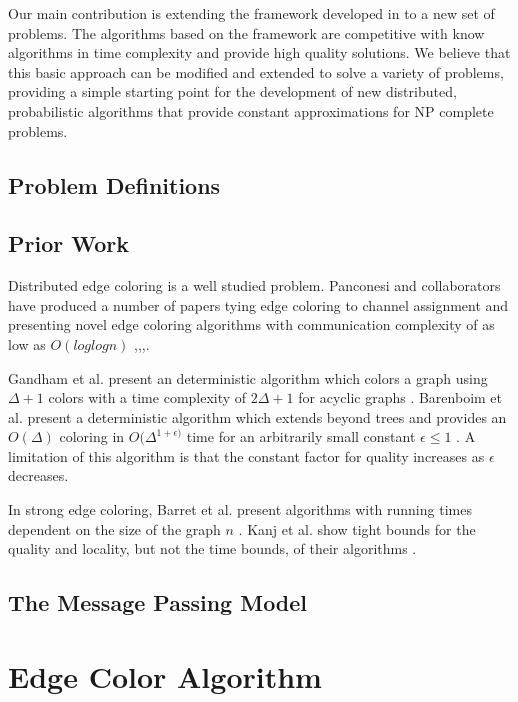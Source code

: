 \documentclass[conference, 10pt, letter]{IEEEtran}
\begin{document}
Our main contribution is extending the framework developed in \cite{Daigle:2011uq} to a new set of problems. The algorithms based on the framework are competitive with know algorithms in time complexity and provide high quality solutions. We believe that this basic approach can be modified and extended to solve a variety of problems, providing a simple starting point for the development of new distributed, probabilistic algorithms that provide constant approximations for NP complete problems.

\subsection{Problem Definitions}

\subsection{Prior Work}
Distributed edge coloring is a well studied problem. Panconesi and collaborators have produced a number of papers tying edge coloring to channel assignment and presenting novel edge coloring algorithms with communication complexity of as low as $O(log{log{n}})$ \cite{Grable:1997:NOD:314161.314266},\cite{Panconesi:1997:RDE:249364.249368},\cite{1041515},\cite{982945}.

Gandham et al. present an deterministic algorithm which colors a graph using $\Delta + 1$ colors with a time complexity of $2\Delta + 1$ for acyclic graphs \cite{1498534}. Barenboim et al. present a deterministic algorithm which extends beyond trees and provides an $O(\Delta)$ coloring in $O(\Delta^{1 + \epsilon)}$ time for an arbitrarily small constant $\epsilon \le 1$ \cite{Barenboim:2011:DDE:1993806.1993825}. A limitation of this algorithm is that the constant factor for quality increases as $\epsilon$ decreases.

In strong edge coloring, Barret et al. present algorithms with running times dependent on the size of the graph $n$ \cite{1598948}. Kanj et al. show tight bounds for the quality and locality, but not the time bounds, of their algorithms \cite{Kanj:2009:LAE:1696884.1696902}.

\subsection{The Message Passing Model}


\section{Edge Color Algorithm}
\end{document}
